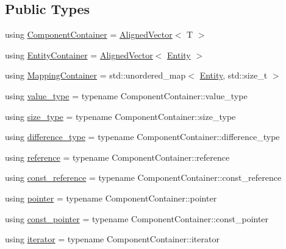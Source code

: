 \subsection*{Public Types}
\begin{DoxyCompactItemize}
\item 
using \mbox{\hyperlink{classmage_1_1_component_manager_ae68422d8d8168c7450d116146604efa6}{Component\+Container}} = \mbox{\hyperlink{namespacemage_a8664bfb5ce2179fc64eae9f82c8a5ba8}{Aligned\+Vector}}$<$ T $>$
\item 
using \mbox{\hyperlink{classmage_1_1_component_manager_a1778c10d17301f112ee99d6daf3e55a7}{Entity\+Container}} = \mbox{\hyperlink{namespacemage_a8664bfb5ce2179fc64eae9f82c8a5ba8}{Aligned\+Vector}}$<$ \mbox{\hyperlink{classmage_1_1_entity}{Entity}} $>$
\item 
using \mbox{\hyperlink{classmage_1_1_component_manager_a1d556c6a0d8ae9efcf0b63d31305352d}{Mapping\+Container}} = std\+::unordered\+\_\+map$<$ \mbox{\hyperlink{classmage_1_1_entity}{Entity}}, std\+::size\+\_\+t $>$
\item 
using \mbox{\hyperlink{classmage_1_1_component_manager_a56aac3b52842bd8955253fa9b528a58d}{value\+\_\+type}} = typename Component\+Container\+::value\+\_\+type
\item 
using \mbox{\hyperlink{classmage_1_1_component_manager_a6bd219525db9ec9f3adb9259e52674da}{size\+\_\+type}} = typename Component\+Container\+::size\+\_\+type
\item 
using \mbox{\hyperlink{classmage_1_1_component_manager_af276ec057e09efba9b826aff4f45cdc2}{difference\+\_\+type}} = typename Component\+Container\+::difference\+\_\+type
\item 
using \mbox{\hyperlink{classmage_1_1_component_manager_a4daeb292f527534c155e359faf7eaf80}{reference}} = typename Component\+Container\+::reference
\item 
using \mbox{\hyperlink{classmage_1_1_component_manager_ae1b1c864f0dc2cd35c63e1084971b89c}{const\+\_\+reference}} = typename Component\+Container\+::const\+\_\+reference
\item 
using \mbox{\hyperlink{classmage_1_1_component_manager_a8a96debf4c395e068990c85e8b66d564}{pointer}} = typename Component\+Container\+::pointer
\item 
using \mbox{\hyperlink{classmage_1_1_component_manager_aca0462fe048337b5453e72cb7facaf31}{const\+\_\+pointer}} = typename Component\+Container\+::const\+\_\+pointer
\item 
using \mbox{\hyperlink{classmage_1_1_component_manager_a28023a75938eb74870ba4b5952ddb61f}{iterator}} = typename Component\+Container\+::iterator

\end{DoxyCompactItemize}
